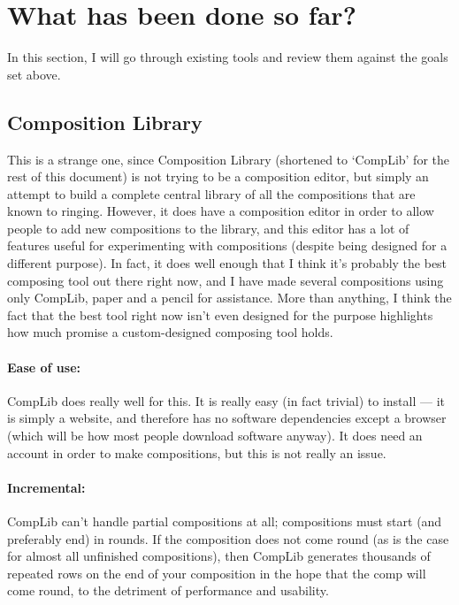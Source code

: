 \documentclass[12pt]{article}
\begin{document}
\section{What has been done so far?}

In this section, I will go through existing tools and review them against the goals set above.

\subsection{Composition Library}

This is a strange one, since Composition Library (shortened to `CompLib' for the rest of this
document) is not trying to be a composition editor, but simply an attempt to build a complete
central library of all the compositions that are known to ringing.  However, it does have a
composition editor in order to allow people to add new compositions to the library, and this
editor has a lot of features useful for experimenting with compositions (despite being designed for
a different purpose).  In fact, it does well enough that I think it's probably the best composing
tool out there right now, and I have made several compositions using only CompLib, paper and a
pencil for assistance.  More than anything, I think the fact that the best tool right now isn't even
designed for the purpose highlights how much promise a custom-designed composing tool holds.


\paragraph{Ease of use:}  CompLib does really well for this.  It is really easy (in fact trivial) to
install --- it is simply a website, and therefore has no software dependencies except a browser
(which will be how most people download software anyway).  It does need an account in order to make
compositions, but this is not really an issue.

\paragraph{Incremental:}  CompLib can't handle partial compositions at all; compositions must start
(and preferably end) in rounds.  If the composition does not come round (as is the case for almost
all unfinished compositions), then CompLib generates thousands of repeated rows on the end of your
composition in the hope that the comp will come round, to the detriment of performance and
usability.
\end{document}
